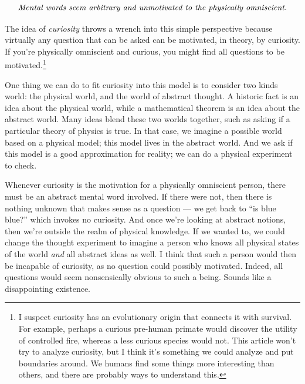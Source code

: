 \documentclass[11pt, oneside]{article}   	%
\begin{document}
\begin{equation}\label{eq3}
    \text{\em Mental words seem arbitrary and unmotivated to the physically
    omniscient.}
\end{equation}

The idea of {\em curiosity} throws a wrench into this simple perspective because
virtually any question that can be asked can be motivated, in theory, by
curiosity. If you're physically omniscient and curious, you might find all
questions to be motivated.\footnote{I suspect curiosity has an evolutionary
origin that connects it with survival. For example, perhaps a curious pre-human
primate would discover the utility of controlled fire, whereas a less curious
species would not. This article won't try to analyze curiosity, but I think it's
something we could analyze and put boundaries around. We humans find some things
more interesting than others, and there are probably ways to understand this.}

One thing we can do to fit curiosity into this model is to consider two kinds
world: the physical world, and the world of abstract thought.
A historic fact is an idea about the physical world, while a mathematical
theorem is an idea about the abstract world.
Many ideas blend these two worlds together, such as asking if a particular
theory of physics is true. In that case, we imagine a possible world based on a
physical model; this model lives in the abstract world. And we ask if this model
is a good approximation for reality; we can do a physical experiment to check.

Whenever curiosity is the motivation for a physically omniscient person, there
must be an abstract mental word involved. If there were not, then there is
nothing unknown that makes sense as a question --- we get back to
``is blue blue?'' which invokes no curiosity. And once we're looking at abstract
notions, then we're outside the realm of physical knowledge.
If we wanted to, we could change the thought experiment to imagine a person who
knows all physical states of the world {\em and} all abstract ideas as well. I
think that such a person would then be incapable of curiosity, as no question
could possibly motivated. Indeed, all questions would seem nonsensically obvious
to such a being. Sounds like a disappointing existence.

\end{document}
